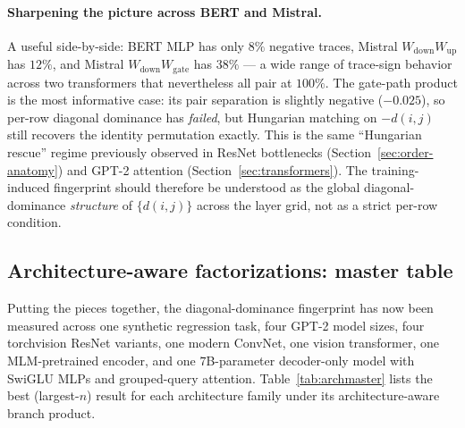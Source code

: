 \documentclass[10pt]{article}
\theoremstyle{remark}
\begin{document}
\paragraph{Sharpening the picture across BERT and Mistral.} A useful
side-by-side: BERT MLP has only $8\%$ negative traces, Mistral
$W_{\mathrm{down}} W_{\mathrm{up}}$ has $12\%$, and Mistral
$W_{\mathrm{down}} W_{\mathrm{gate}}$ has $38\%$ --- a wide range of
trace-sign behavior across two transformers that nevertheless all pair
at $100\%$. The gate-path product is the most informative case: its
pair separation is slightly negative ($-0.025$), so per-row diagonal
dominance has \emph{failed}, but Hungarian matching on $-d(i,j)$ still
recovers the identity permutation exactly. This is the same
``Hungarian rescue'' regime previously observed in ResNet bottlenecks
(Section~\ref{sec:order-anatomy}) and GPT-2 attention
(Section~\ref{sec:transformers}). The training-induced fingerprint
should therefore be understood as the global diagonal-dominance
\emph{structure} of $\{d(i,j)\}$ across the layer grid, not as a strict
per-row condition.

\subsection{Architecture-aware factorizations: master table}

Putting the pieces together, the diagonal-dominance fingerprint has now
been measured across one synthetic regression task, four GPT-2 model
sizes, four torchvision ResNet variants, one modern ConvNet, one
vision transformer, one MLM-pretrained encoder, and one $7$B-parameter
decoder-only model with SwiGLU MLPs and grouped-query attention.
Table~\ref{tab:archmaster} lists the best (largest-$n$) result for each
architecture family under its architecture-aware branch product.
\end{document}
